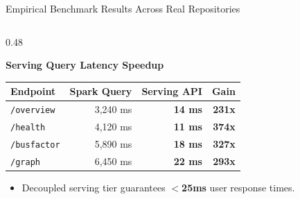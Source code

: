\documentclass[aspectratio=169, 10pt]{beamer}
\begin{document}
\begin{frame}{Empirical Benchmark Results Across Real Repositories}
\begin{columns}[T]
    \begin{column}{0.48\textwidth}
      \begin{exampleblock}{\textbf{Serving Query Latency Speedup}}
        \centering
        \scriptsize
        \begin{tabular}{l r r r}
          \toprule
          \textbf{Endpoint} & \textbf{Spark Query} & \textbf{Serving API} & \textbf{Gain} \\
          \midrule
          \texttt{/overview} & 3,240 ms & \textbf{14 ms} & \textbf{231x} \\
          \texttt{/health} & 4,120 ms & \textbf{11 ms} & \textbf{374x} \\
          \texttt{/busfactor} & 5,890 ms & \textbf{18 ms} & \textbf{327x} \\
          \texttt{/graph} & 6,450 ms & \textbf{22 ms} & \textbf{293x} \\
          \bottomrule
        \end{tabular}
        \vspace{0.1cm}
        \begin{itemize}
          \item Decoupled serving tier guarantees \textbf{$<$25ms} user response times.
        \end{itemize}
      \end{exampleblock}
    \end{column}
  \end{columns}
\end{frame}
\end{document}
